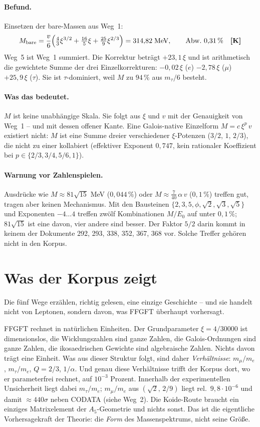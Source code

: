 \paragraph{Befund.}
Einsetzen der bare-Massen aus Weg~1:
\[
  M_\text{bare} = \frac{v}{6}\Bigl(\tfrac{4}{3}\xi^{3/2} + \tfrac{16}{5}\xi
  + \tfrac{25}{9}\xi^{2/3}\Bigr) = 314{,}82\;\text{MeV}, \qquad
  \text{Abw.\ } 0{,}31\,\% \quad \textbf{[K]}
\]
Weg~5 ist Weg~1 summiert. Die Korrektur beträgt $+23{,}1\,\xi$ und ist
arithmetisch die gewichtete Summe der drei Einzelkorrekturen:
$-0{,}02\,\xi$ ($e$) $-2{,}78\,\xi$ ($\mu$) $+25{,}9\,\xi$ ($\tau$).
Sie ist $\tau$-dominiert, weil $M$ zu $94\,\%$ aus $m_\tau/6$ besteht.

\paragraph{Was das bedeutet.}
$M$ ist keine unabhängige Skala. Sie folgt aus $\xi$ und $v$ mit der
Genauigkeit von Weg~1 -- und mit dessen offener Kante. Eine
Galois-native Einzelform $M = c\,\xi^p\,v$ existiert nicht: $M$ ist eine
Summe dreier verschiedener $\xi$-Potenzen ($3/2$, $1$, $2/3$), die nicht
zu einer kollabiert (effektiver Exponent $0{,}747$, kein rationaler
Koeffizient bei $p\in\{2/3,3/4,5/6,1\}$).

\paragraph{Warnung vor Zahlenspielen.}
Ausdrücke wie $M \approx 81\sqrt{15}$ MeV ($0{,}044\,\%$) oder
$M \approx \tfrac{7}{40}\,\alpha\,v$ ($0{,}1\,\%$) treffen gut, tragen aber
keinen Mechanismus. Mit den Bausteinen $\{2,3,5,\phi,\sqrt2,\sqrt3,\sqrt5\}$
und Exponenten $-4\ldots4$ treffen zwölf Kombinationen $M/E_0$ auf unter
$0{,}1\,\%$; $81\sqrt{15}$ ist eine davon, vier andere sind besser. Der Faktor
$5/2$ darin kommt in keinem der Dokumente 292, 293, 338, 352, 367, 368 vor.
Solche Treffer gehören nicht in den Korpus.

\section{Was der Korpus zeigt}

Die fünf Wege erzählen, richtig gelesen, eine einzige Geschichte -- und sie
handelt nicht von Leptonen, sondern davon, was FFGFT überhaupt vorhersagt.

FFGFT rechnet in natürlichen Einheiten. Der Grundparameter $\xi = 4/30000$ ist
dimensionslos, die Wicklungszahlen sind ganze Zahlen, die Galois-Ordnungen sind
ganze Zahlen, die ikosaedrischen Gewichte sind algebraische Zahlen. Nichts davon
trägt eine Einheit. Was aus dieser Struktur folgt, sind daher \emph{Verhältnisse}:
$m_\mu/m_e$, $m_\tau/m_e$, $Q = 2/3$, $1/\alpha$. Und genau diese Verhältnisse
trifft der Korpus dort, wo er parameterfrei rechnet, auf $10^{-3}$ Prozent.
Innerhalb der experimentellen Unsicherheit liegt dabei $m_\tau/m_e$; $m_\mu/m_e$
aus $(\sqrt2,\,2/9)$ liegt rel.\ $9{,}8\cdot10^{-6}$ und damit
${\approx}440\sigma$ neben CODATA (siehe Weg~2). Die Koide-Route braucht ein einziges
Matrixelement der $A_5$-Geometrie und nichts sonst. Das ist die eigentliche
Vorhersagekraft der Theorie: die \emph{Form} des Massenspektrums, nicht seine
Größe.

